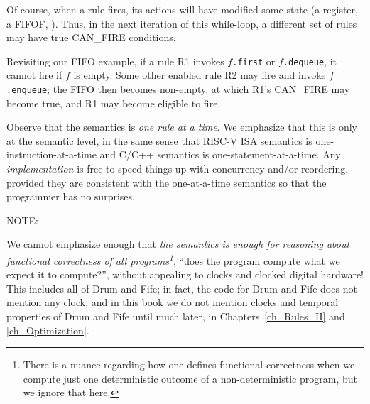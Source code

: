 Of course, when a rule fires, its actions will have modified some
state (a register, a FIFOF, {\etc}).  Thus, in the next iteration of
this while-loop, a different set of rules may have true CAN\_FIRE
conditions.

Revisiting our FIFO example, if a rule R1 invokes $f$\verb|.first| or
$f$\verb|.dequeue|, it cannot fire if $f$ is empty.  Some other
enabled rule R2 may fire and invoke $f$\verb|.enqueue|; the FIFO then
becomes non-empty, at which R1's CAN\_FIRE may become true, and R1 may
become eligible to fire.

Observe that the semantics is \emph{one rule at a time}.  We emphasize
that this is only at the semantic level, in the same sense that RISC-V
ISA semantics is one-instruction-at-a-time and C/C++ semantics is
one-statement-at-a-time.  Any \emph{implementation} is free to speed
things up with concurrency and/or reordering, provided they are
consistent with the one-at-a-time semantics so that the programmer has
no surprises.

\vspace{2ex}

NOTE: 

\vspace{2ex}

We cannot emphasize enough that \emph{the semantics is enough for
reasoning about functional correctness of all {\BSV}
programs\footnote{There is a nuance regarding how one defines
functional correctness when we compute just one deterministic outcome
of a non-deterministic program, but we ignore that here.}}, {\ie}
``does the program compute what we expect it to compute?'', without
appealing to clocks and clocked digital hardware! This includes all of
Drum and Fife; in fact, the {\BSV} code for Drum and Fife does not
mention any clock, and in this book we do not mention clocks and
temporal properties of Drum and Fife until much later, in
Chapters~\ref{ch_Rules_II} and \ref{ch_Optimization}.

